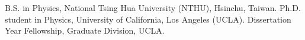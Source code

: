 %
\renewcommand{\vitastretch}{1}%

\renewcommand{\vitadatewidth}{1.5in} %

\renewcommand{\vitatextwidth}{4.75in}  %

                {B.S. in Physics, National Tsing Hua University (NTHU), Hsinchu, Taiwan.}
                {Ph.D. student in Physics, University of California, Los Angeles (UCLA).}
                {Dissertation Year Fellowship, Graduate Division, UCLA.}






\renewcommand{\pubstretch}{1.5}%

\let\oldbibitem\bibitem%
\renewcommand{\bibitem}[2][]{\oldbibitem{#2}}%

